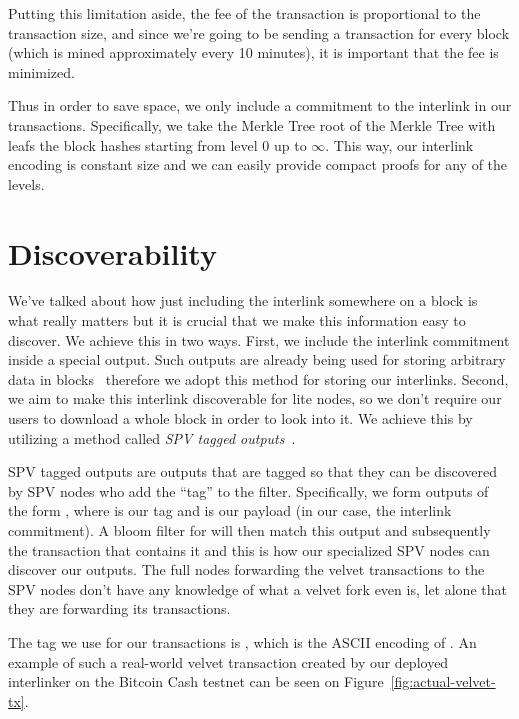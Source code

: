 
Putting this limitation aside, the fee of the transaction is proportional to the transaction size, and since we're going to be sending a transaction for every block (which is mined approximately every 10 minutes), it is important that the fee is minimized.

Thus in order to save space, we only include a commitment to the interlink in our transactions. Specifically, we take the Merkle Tree root of the Merkle Tree with leafs the block hashes starting from level $0$ up to $\infty$. This way, our interlink encoding is constant size and we can easily provide compact proofs for any of the levels.

\section{Discoverability}
We've talked about how just including the interlink somewhere on a block is what really matters but it is crucial that we make this information easy to discover. We achieve this in two ways. First, we include the interlink commitment inside a special  output. Such outputs are already being used for storing arbitrary data in blocks~\cite{arbitrary-data} therefore we adopt this method for storing our interlinks. Second, we aim to make this interlink discoverable for lite nodes, so we don't require our users to download a whole block in order to look into it. We achieve this by utilizing a method called \emph{SPV tagged outputs}~\cite{spv-tagged}.

SPV tagged outputs are outputs that are tagged so that they can be discovered by SPV nodes who add the ``tag'' to the filter. Specifically, we form outputs of the form , where  is our tag and  is our payload (in our case, the interlink commitment). A bloom filter for  will then match this output and subsequently the transaction that contains it and this is how our specialized SPV nodes can discover our outputs. The full nodes forwarding the velvet transactions to the SPV nodes don't have any knowledge of what a velvet fork even is, let alone that they are forwarding its transactions.

The tag we use for our transactions is , which is the ASCII encoding of . An example of such a real-world velvet transaction created by our deployed interlinker on the Bitcoin Cash testnet can be seen on Figure~\ref{fig:actual-velvet-tx}.

